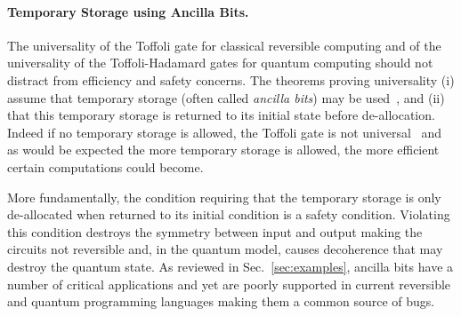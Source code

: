 \documentclass[sigplan,10pt,review,anonymous]{acmart}
\begin{document}
\paragraph*{Temporary Storage using Ancilla Bits.} The universality of
the Toffoli gate for classical reversible computing and of the
universality of the Toffoli-Hadamard gates for quantum computing should
not distract from efficiency and safety concerns. The theorems proving
universality (i) assume that temporary storage (often called
\emph{ancilla bits}) may be used~\cite{Toffoli:1980}, and (ii) that
this temporary storage is returned to its initial state before
de-allocation. Indeed if no temporary storage is allowed, the Toffoli
gate is not
universal~\cite{DBLP:conf/innovations/AaronsonGS17,DBLP:journals/corr/Xu15e}
and as would be expected the more temporary storage is allowed, the
more efficient certain computations could become.

More fundamentally, the condition requiring that the temporary storage
is only de-allocated when returned to its initial condition is a
safety condition. Violating this condition destroys the symmetry
between input and output making the circuits not reversible and, in
the quantum model, causes decoherence that may destroy the quantum
state. As reviewed in Sec.~\ref{sec:examples}, ancilla bits have a
number of critical applications and yet are poorly supported in
current reversible and quantum programming languages making them a
common source of bugs.
\end{document}
